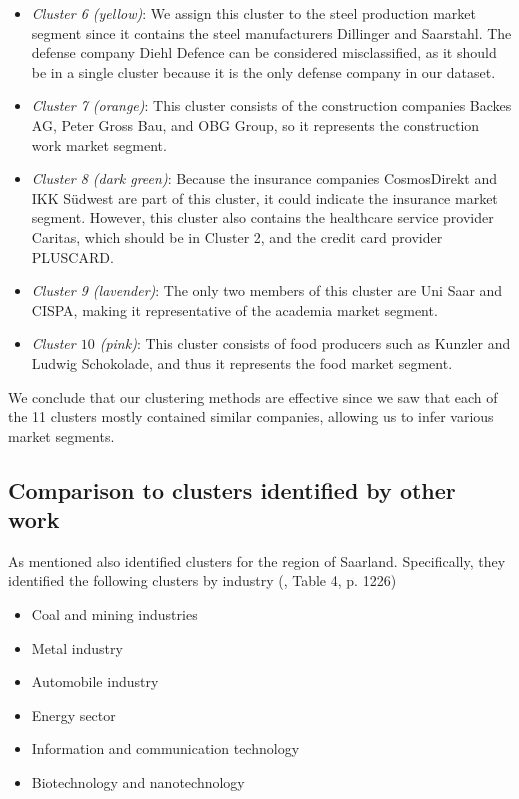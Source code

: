 \documentclass[conference]{IEEEtran}
\begin{document}
\begin{itemize}
	\item \textit{Cluster 6 (yellow)}: We assign this cluster to the steel production market segment since it contains the steel manufacturers Dillinger and Saarstahl. The defense company Diehl Defence can be considered misclassified, as it should be in a single cluster because it is the only defense company in our dataset.
	
	\item \textit{Cluster 7 (orange)}: This cluster consists of the construction companies Backes AG, Peter Gross Bau, and OBG Group, so it represents the construction work market segment.
	
	\item \textit{Cluster 8 (dark green)}: Because the insurance companies CosmosDirekt and IKK Südwest are part of this cluster, it could indicate the insurance market segment. However, this cluster also contains the healthcare service provider Caritas, which should be in Cluster 2, and the credit card provider PLUSCARD.
	
	\item \textit{Cluster 9 (lavender)}: The only two members of this cluster are Uni Saar and CISPA, making it representative of the academia market segment.
	
	\item \textit{Cluster $10$ (pink)}: This cluster consists of food producers such as Kunzler and Ludwig Schokolade, and thus it represents the food market segment.
\end{itemize}
We conclude that our clustering methods are effective since we saw that each of the 11 clusters mostly contained similar companies, allowing us to infer various market segments.

\subsection{Comparison to clusters identified by other work}

As mentioned \cite{saarlandeco2} also identified clusters for the region of Saarland. Specifically, they identified the following clusters by industry (\cite{saarlandeco2}, Table 4, p. 1226)

\begin{itemize}
	\item Coal and mining industries
	\item Metal industry
	\item Automobile industry
	\item Energy sector
	\item Information and communication technology
	\item Biotechnology and nanotechnology
\end{itemize}
\end{document}
